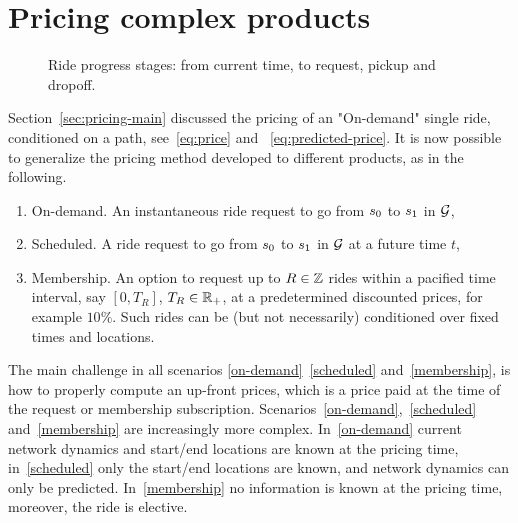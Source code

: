 \documentclass[12pt]{article}
\begin{document}
{{{{{{{\section{Pricing complex products}\label{sec:complex-pricing}
\begin{figure}[!ht]
\centering
{}
\caption{Ride progress stages: from current time, to request, pickup and dropoff. }
\label{fig:ride-time}
\end{figure}

Section~\ref{sec:pricing-main} discussed the pricing of an "On-demand" single ride, conditioned on a path, see~\eqref{eq:price} and ~\eqref{eq:predicted-price}. It is now possible to generalize the pricing method developed to different products, as in the following.
\begin{enumerate}[label={({\Alph*})}]
    \item On-demand. An instantaneous ride request to go from  ${s_0}$ to ${ s_1}$ in $\mathcal{G}$,   \label{on-demand}
    \item Scheduled. A ride request to go from ${s_0}$ to ${ s_1}$ in $\mathcal{G}$ at a future time $t$,  \label{scheduled}
    \item Membership. An option to request up to $R \in \mathbb{Z}$ rides within a pacified time interval, say $[0, T_R]$, $T_R \in \mathbb{R}_+$, at a predetermined discounted prices, for example $10\%$. Such rides can be (but not necessarily) conditioned over fixed times and locations.   \label{membership}
\end{enumerate}

The main challenge in all scenarios \ref{on-demand}~\ref{scheduled} and~\ref{membership}, is how to properly compute an up-front prices, which is a price paid at the time of the request or membership subscription. Scenarios~\ref{on-demand},~\ref{scheduled} and~\ref{membership} are increasingly more complex. In~\ref{on-demand} current network dynamics and start/end locations are known at the pricing time, in~\ref{scheduled} only the start/end locations are known, and network dynamics can only be predicted. In~\ref{membership} no information is known at the pricing time, moreover, the ride is elective.

}}}}}}}
\end{document}
